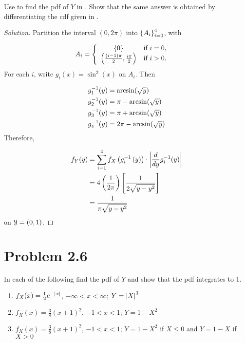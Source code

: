 \documentclass[12pt,letterpaper,reqno]{amsart}
\numberwithin{equation}{subsection}
\begin{document}
Use \cite[Theorem 2.1.8 on page 53]{Berger-Casella} to find the pdf of $Y$ in \cite[Example 2.1.2 on page 49]{Berger-Casella}. Show that the same answer is obtained by differentiating the cdf given in \cite[Equation 2.1.6 on page 49]{Berger-Casella}.

\begin{proof}[Solution]
Partition the interval $(0, 2\pi)$ into $\left\{ {A_i} \right\}_{i=0}^4$, with

\begin{align*}
    A_i &= \left\{ \begin{array}{cl}
         \left\{ {0} \right\} & \mbox{if $i = 0$}, \\
         \left( {\frac{(i-1)\pi}{2}}, {\frac{i \pi }{2}} \right) & \mbox{if $i > 0$}.
    \end{array} \right.
\end{align*}
For each $i$, write $g_i(x) = \sin^2(x)$ on $A_i$. Then

\begin{align*}
    {g^{-1}_1}\! \left( {y} \right) &= \arcsin(\sqrt{y}) \\
    {g^{-1}_2}\! \left( {y} \right) &= \pi - \arcsin(\sqrt{y}) \\
    {g^{-1}_3}\! \left( {y} \right) &= \pi + \arcsin(\sqrt{y}) \\
    {g^{-1}_4}\! \left( {y} \right) &= 2\pi - \arcsin(\sqrt{y})
\end{align*}
Therefore,

\begin{align*}
    {f_Y}\! \left( {y} \right) &= \sum_{i=1}^4 f_X \left( g_i^{-1} \left( y \right) \right) \cdot \left\lvert{\frac{d{}}{d{y}} g_i^{-1}(y)}\right\rvert \\
    &= 4 \left(\frac{1}{2\pi} \right) \left[ \frac{1}{2 \sqrt{y-y^2}} \right] \\
    &= \frac{1}{\pi \sqrt{y-y^2}}
\end{align*}
on $\mathcal{{Y}} = (0,1)$.
\end{proof}

\newpage
\section{Problem 2.6}
In each of the following find the pdf of $Y$ and show that the pdf integrates to 1.

\begin{enumerate}[label=(\alph*),leftmargin=*]
    \item $f_X(x) = \frac{1}{2} e^{-\left\lvert{x}\right\rvert}$, $-\infty < x < \infty$; $Y = \left\lvert{X}\right\rvert^3$
    \item $f_X(x) = \frac{3}{8} \left( x + 1 \right)^2$, $-1 < x < 1$; $Y = 1 - X^2$
    \item $f_X(x) = \frac{3}{8} \left( x + 1 \right)^2$, $-1 < x < 1$; $Y = 1 - X^2$ if $X \leq 0$ and $Y = 1-X$ if $X > 0$
\end{enumerate}
\end{document}
